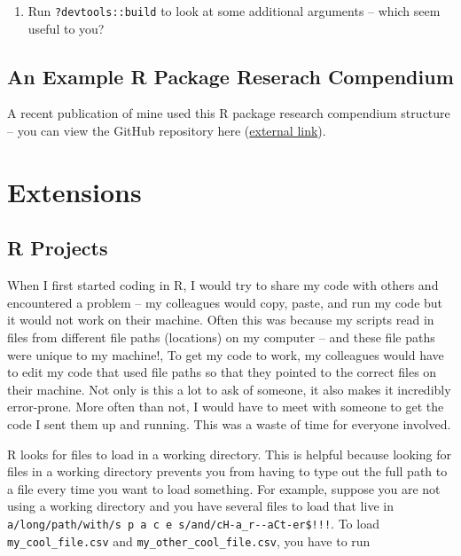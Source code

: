\documentclass[
]{book}
\providecommand{\tightlist}{%
  \setlength{\itemsep}{0pt}\setlength{\parskip}{0pt}}
\begin{document}
\begin{enumerate}
\def\labelenumi{\arabic{enumi}.}
\tightlist
\item
  Run \texttt{?devtools::build} to look at some additional arguments -- which seem useful to you?
\end{enumerate}

\hypertarget{ex-rc}{%
\section{An Example R Package Reserach Compendium}\label{ex-rc}}

A recent publication of mine used this R package research compendium structure -- you can view the GitHub repository here (\href{https://github.com/michaeldumelle/DumelleEtAl2021STLMM}{external link}).

\hypertarget{extensions}{%
\chapter{Extensions}\label{extensions}}

\hypertarget{r-projects}{%
\section{R Projects}\label{r-projects}}

When I first started coding in R, I would try to share my code with others and encountered a problem -- my colleagues would copy, paste, and run my code but it would not work on their machine. Often this was because my scripts read in files from different file paths (locations) on my computer -- and these file paths were unique to my machine!, To get my code to work, my colleagues would have to edit my code that used file paths so that they pointed to the correct files on their machine. Not only is this a lot to ask of someone, it also makes it incredibly error-prone. More often than not, I would have to meet with someone to get the code I sent them up and running. This was a waste of time for everyone involved.

R looks for files to load in a working directory. This is helpful because looking for files in a working directory prevents you from having to type out the full path to a file every time you want to load something. For example, suppose you are not using a working directory and you have several files to load that live in \texttt{a/long/path/with/s\ p\ a\ c\ e\ s/and/cH-a\_r-\/-aCt-er\$!!!}. To load \texttt{my\_cool\_file.csv} and \texttt{my\_other\_cool\_file.csv}, you have to run
\end{document}
